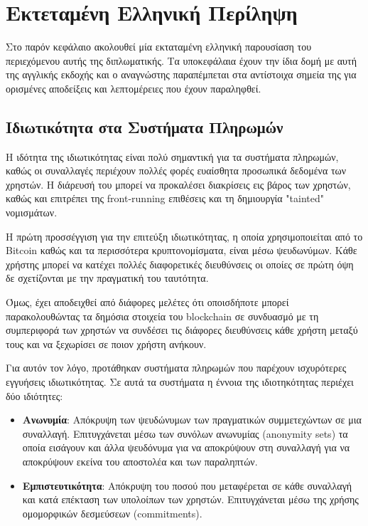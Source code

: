 \chapter{Εκτεταμένη Ελληνική Περίληψη}

Στο παρόν κεφάλαιο ακολουθεί μία εκταταμένη ελληνική παρουσίαση του περιεχόμενου αυτής της διπλωματικής. Τα υποκεφάλαια έχουν την ίδια δομή με αυτή της αγγλικής εκδοχής και ο αναγνώστης παραπέμπεται στα αντίστοιχα σημεία της για ορισμένες αποδείξεις και λεπτομέρειες που έχουν παραληφθεί. 


\section{Ιδιωτικότητα στα Συστήματα Πληρωμών}
Η ιδότητα της ιδιωτικότητας είναι πολύ σημαντική για τα συστήματα πληρωμών, καθώς οι συναλλαγές περιέχουν πολλές φορές ευαίσθητα προσωπικά δεδομένα των χρηστών. Η διάρευσή του μπορεί να προκαλέσει διακρίσεις εις βάρος των χρηστών, καθώς και επιτρέπει της front-running επιθέσεις και τη δημιουργία "tainted" νομισμάτων.

Η πρώτη προσσέγγιση για την επιτεύξη ιδιωτικότητας, η οποία χρησιμοποιείται από το Bitcoin καθώς και τα περισσότερα κρυπτονομίσματα, είναι μέσω ψευδωνύμων. Κάθε χρήστης μπορεί να κατέχει πολλές διαφορετικές διευθύνσεις οι οποίες σε πρώτη όψη δε σχετίζονται με την πραγματική του ταυτότητα. 

Όμως, έχει αποδειχθεί από διάφορες μελέτες ότι οποισδήποτε μπορεί παρακολουθώντας τα δημόσια στοιχεία του blockchain σε συνδυασμό με τη συμπεριφορά των χρηστών να συνδέσει τις διάφορες διευθύνσεις κάθε χρήστη μεταξύ τους και να ξεχωρίσει σε ποιον χρήστη ανήκουν.

Για αυτόν τον λόγο, προτάθηκαν συστήματα πληρωμών που παρέχουν ισχυρότερες εγγυήσεις ιδιωτικότητας. Σε αυτά τα συστήματα η έννοια της ιδιοτηκότητας περιέχει δύο ιδιότητες:
\begin{itemize}
    \item \textbf{Ανωνυμία}: Απόκρυψη των ψευδώνυμων των πραγματικών συμμετεχώντων σε μια συναλλαγή. Επιτυγχάνεται μέσω των συνόλων ανωνυμίας (anonymity sets) τα οποία εισάγουν και άλλα ψευδόνυμα για να αποκρύψουν στη συναλλαγή για να αποκρύψουν εκείνα του αποστολέα και των παραληπτών.
    \item \textbf{Εμπιστευτικότητα}: Απόκρυψη του ποσού που μεταφέρεται σε κάθε συναλλαγή και κατά επέκταση των υπολοίπων των χρηστών. Επιτυγχάνεται μέσω της χρήσης ομομορφικών δεσμεύσεων (commitments).
\end{itemize}

